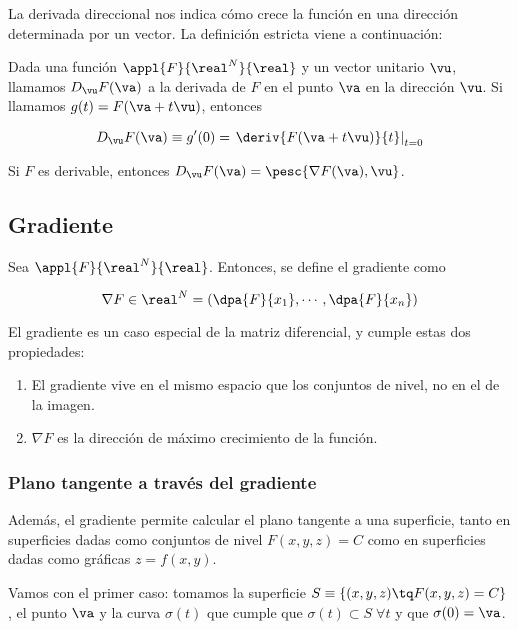 \documentclass[12pt,a4paper,titlepage]{apuntes}
\begin{document}
La derivada direccional nos indica cómo crece la función en una dirección determinada por un vector. La definición estricta viene a continuación:
\begin{defn}
Dada una función $\appl{F}{\real^N}{\real}$ y un vector unitario $\vu$, llamamos $D_{\vu} F(\va)$ a la derivada de $F$ en el punto $\va$ en la dirección $\vu$. Si llamamos $g(t) = F(\va + t\vu)$, entonces

\[ D_{\vu} F(\va) \equiv g'(0) = \left.\deriv{F(\va + t\vu)}{t}\right|_{t=0} \]
\end{defn}

\begin{theorem}
Si $F$ es derivable, entonces $D_{\vu} F(\va) = \pesc{\nabla F(\va), \vu}$.
\end{theorem}

\subsection{Gradiente}
\begin{defn}[Gradiente]
Sea $\appl{F}{\real^N}{\real}$. Entonces, se define el gradiente como 

\[ \nabla F \in \real^N = \left(\dpa{F}{x_1},\cdots,\dpa{F}{x_n}\right) \]
\end{defn}

El gradiente es un caso especial de la matriz diferencial, y cumple estas dos propiedades:

\begin{enumerate}
\item El gradiente vive en el mismo espacio que los conjuntos de nivel, no en el de la imagen.
\item $\nabla F$ es la dirección de máximo crecimiento de la función.
\end{enumerate}

\subsubsection{Plano tangente a través del gradiente}
Además, el gradiente permite calcular el plano tangente a una superficie, tanto en superficies dadas como conjuntos de nivel $F(x,y,z) = C$ como en superficies dadas como gráficas $z=f(x,y)$. 

Vamos con el primer caso: tomamos la superficie $S\equiv \{(x,y,z) \tq F(x,y,z) = C\}$, el punto $\va$ y la curva $\sigma (t)$ que cumple que $\sigma (t) \subset S \; \forall t$ y que $\sigma (0) = \va$.
\end{document}
